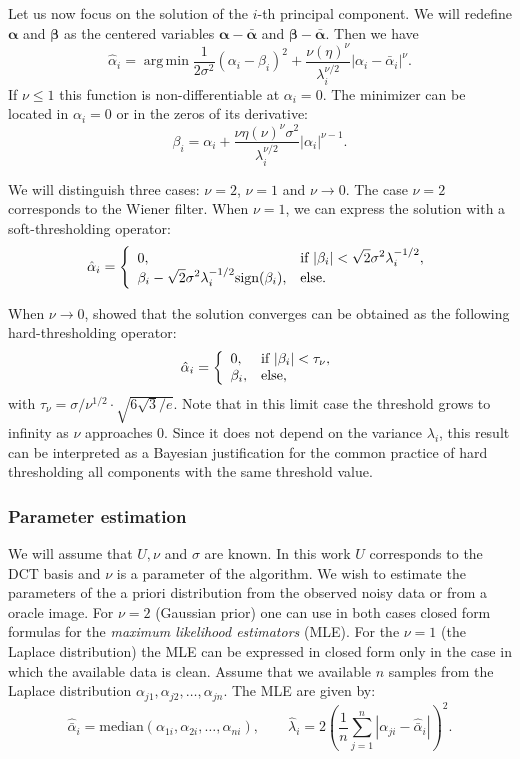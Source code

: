 \documentclass{ipol}
\newcommand{\ma}[1]{\boldsymbol{#1}}
\DeclareMathOperator*{\argmin}{arg\,min}
\begin{document}
Let us now focus on the solution of the $i$-th principal component. We will
redefine $\ma \alpha$ and $\ma \beta$ as the centered variables $\ma \alpha -
\bar{\ma \alpha}$ and $\ma \beta - \bar{\ma \alpha}$. Then we have
\[\hat \alpha_i = \argmin \frac1{2\sigma^2} (\alpha_i -
\beta_i)^2 + \frac{\nu(\eta)^{\nu}}{\lambda_i^{\nu/2}}{|\alpha_i - \bar{\alpha}_i|^\nu}.\]
If $\nu \leqslant 1$ this function is non-differentiable at $\alpha_i = 0$.
The minimizer can be located in $\alpha_i = 0$ or in the zeros of its derivative: 
\[\beta_i = \alpha_i + \frac{\nu\eta(\nu)^{\nu}\sigma^2}{\lambda_i^{\nu/2}}|\alpha_i|^{\nu-1}.\]

We will distinguish three cases: $\nu = 2$, $\nu = 1$ and $\nu \to 0$. The case $\nu = 2$
corresponds to the Wiener filter. When $\nu = 1$, we can express the solution
with a soft-thresholding operator:
\[\hat\alpha_i = \left\{
\begin{array}{l l}
	0,& \displaystyle\text{if }|\beta_i| < \sqrt{2} \sigma^2{\lambda_i^{-1/2}},\\
	\displaystyle\beta_i - \sqrt{2} \sigma^2{\lambda_i^{-1/2}}\text{sign}(\beta_i),&\text{else.}
\end{array}
\right.\]

When $\nu\to 0$, \cite{Moulin1999} showed that the solution converges can be
obtained as the following hard-thresholding operator:
\[\hat\alpha_i = \left\{
\begin{array}{l l}
	0,& \displaystyle\text{if }|\beta_i| < \tau_\nu,\\
	\displaystyle\beta_i,&\text{else,}
\end{array}
\right.\]
with $\tau_\nu = \sigma/\nu^{1/2}\cdot\sqrt{6\sqrt{3}/e}$. Note that in this limit
case the threshold grows to infinity as $\nu$ approaches $0$. Since it does
not depend on the variance $\lambda_i$, this result can be interpreted as a
Bayesian justification for the common practice of hard thresholding all
components with the same threshold value. 


\subsubsection{Parameter estimation}

We will assume that $U, \nu$ and $\sigma$ are known. In this work $U$ corresponds
to the DCT basis and $\nu$ is a parameter of the algorithm.
%
We wish to estimate the parameters of the a priori distribution
from the observed noisy data or from a oracle image. For $\nu = 2$ (Gaussian
prior) one can use in both cases closed form formulas for the \emph{maximum
likelihood estimators} (MLE). For the $\nu = 1$ (the Laplace distribution)
the MLE can be expressed in closed form only in the case in which the available 
data is clean. Assume that we available $n$ samples from the Laplace distribution
$\alpha_{j1}, \alpha_{j2},\dots,\alpha_{jn}$. The MLE are given by:
\begin{equation}
	\hat{\bar \alpha}_i = \text{median}(\alpha_{1i}, \alpha_{2i},\dots,\alpha_{ni}),\quad\quad
	\hat \lambda_i = 2 \left(\frac1n\sum_{j = 1}^n |\alpha_{ji} - \hat{\bar \alpha}_i|\right)^2.
	\label{eeq:mle_laplace}
\end{equation}
\end{document}
